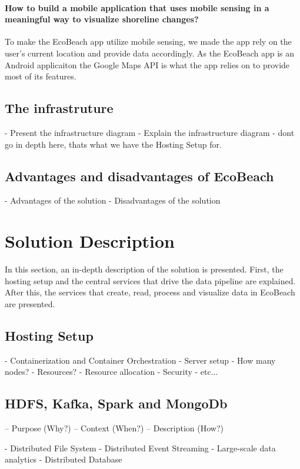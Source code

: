 \paragraph{How to build a mobile application that uses mobile sensing in a meaningful way to visualize shoreline changes?} To make the EcoBeach app utilize mobile sensing, we made the app rely on the user's current location and provide data accordingly. As the EcoBeach app is an Android applicaiton the Google Maps API is what the app relies on to provide most of its features.

\subsection{The infrastruture}
- Present the infrastructure diagram
- Explain the infrastructure diagram
- dont go in depth here, thats what we have the Hosting Setup for.

\subsection{Advantages and disadvantages of EcoBeach}
- Advantages of the solution
- Disadvantages of the solution

\section{Solution Description}

In this section, an in-depth description of the solution is presented.  First, the hosting setup and the central services that drive the data pipeline are explained. After this, the services that create, read, process and visualize data in EcoBeach are presented.

\subsection{Hosting Setup}

- Containerization and Container Orchestration
- Server setup
- How many nodes?
- Resources?
- Resource allocation
- Security
- etc...

\subsection{HDFS, Kafka, Spark and MongoDb}

– Purpose (Why?)
– Context (When?)
– Description (How?)

- Distributed File System
- Distributed Event Streaming
- Large-scale data analytics
- Distributed Database

